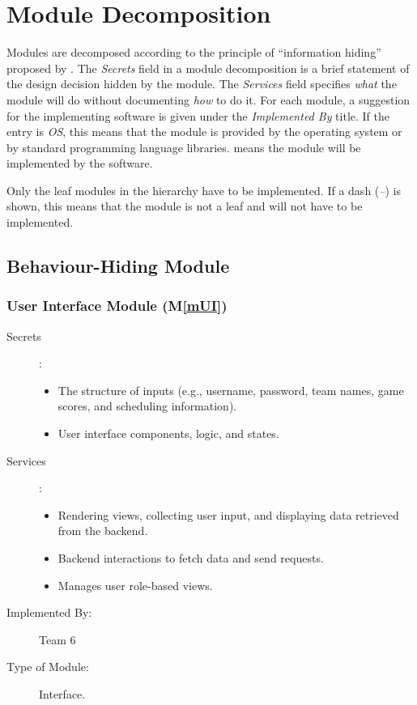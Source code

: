 \documentclass[12pt, titlepage]{article}
\newcommand{\mref}[1]{M\ref{#1}}
\begin{document}
\section{Module Decomposition} \label{SecMD}

Modules are decomposed according to the principle of ``information hiding''
proposed by \citet{ParnasEtAl1984}. The \emph{Secrets} field in a module
decomposition is a brief statement of the design decision hidden by the
module. The \emph{Services} field specifies \emph{what} the module will do
without documenting \emph{how} to do it. For each module, a suggestion for the
implementing software is given under the \emph{Implemented By} title. If the
entry is \emph{OS}, this means that the module is provided by the operating
system or by standard programming language libraries.  \emph{\progname{}} means the
module will be implemented by the \progname{} software.

Only the leaf modules in the hierarchy have to be implemented. If a dash
(\emph{--}) is shown, this means that the module is not a leaf and will not have
to be implemented.

\subsection{Behaviour-Hiding Module}

\subsubsection{User Interface Module (\mref{mUI})}

\begin{description}
\item[Secrets]: 
    \begin{itemize}
        \item The structure of inputs (e.g., username, password, team names, game scores, and scheduling information). 
        \item User interface components, logic, and states.
    \end{itemize}
    
\item[Services]: 
    \begin{itemize}
        \item Rendering views, collecting user input, and displaying data retrieved from the backend.
        \item Backend interactions to fetch data and send requests.
        \item Manages user role-based views.
    \end{itemize}

\item[Implemented By:] Team 6
    
\item[Type of Module:] Interface.

\end{description}
\end{document}
